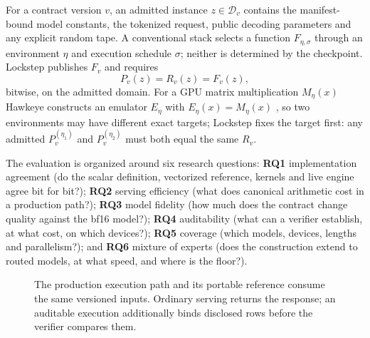 \documentclass{article}
\begin{document}
For a contract version $v$, an admitted instance $z\in\mathcal{D}_v$ contains the
manifest-bound model constants, the tokenized request, public decoding parameters and any
explicit random tape.  A conventional stack selects a function $F_{\eta,\sigma}$ through an
environment $\eta$ and execution schedule $\sigma$; neither is determined by the checkpoint.
Lockstep publishes $F_v$ and requires
\begin{equation}
  P_v(z)=R_v(z)=F_v(z),
  \label{eq:agreement}
\end{equation}
bitwise, on the admitted domain.  For a GPU matrix multiplication $M_\eta(x)$ Hawkeye
constructs an emulator $E_\eta$ with $E_\eta(x)=M_\eta(x)$ \cite{badash2026hawkeye}, so two
environments may have different exact targets; Lockstep fixes the target first: any admitted
$P_v^{(\eta_1)}$ and $P_v^{(\eta_2)}$ must both equal the same $R_v$.

The evaluation is organized around six research questions: \textbf{RQ1} implementation
agreement (do the scalar definition, vectorized reference, kernels and live engine agree bit
for bit?); \textbf{RQ2} serving efficiency (what does canonical arithmetic cost in a
production path?); \textbf{RQ3} model fidelity (how much does the contract change quality
against the bf16 model?); \textbf{RQ4} auditability (what can a verifier establish, at what
cost, on which devices?); \textbf{RQ5} coverage (which models, devices, lengths and
parallelism?); and \textbf{RQ6} mixture of experts (does the construction extend to routed
models, at what speed, and where is the floor?).

\begin{figure}[ht]
\centering
{}
\caption{The production execution path and its portable reference consume the same versioned
inputs.  Ordinary serving returns the response; an auditable execution additionally binds
disclosed rows before the verifier compares them.}
\label{fig:overview}
\end{figure}
\end{document}

